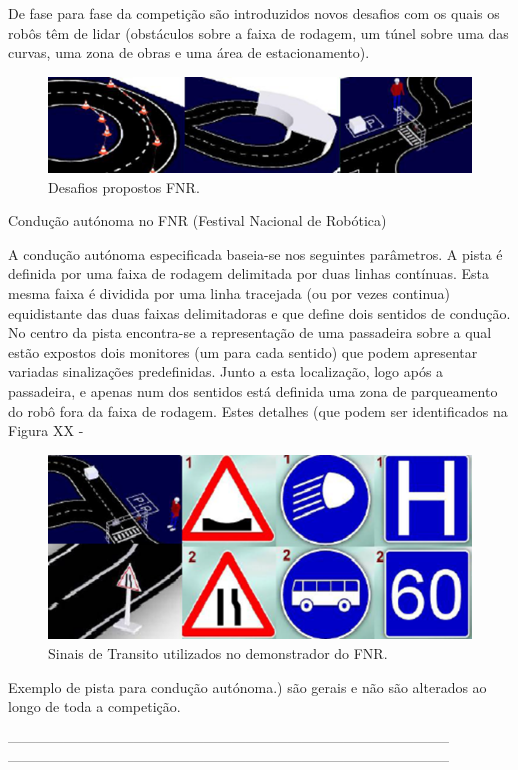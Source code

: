 \documentclass[a4paper,10pt]{texRel}
\begin{document}
De fase para fase da competição são introduzidos novos desafios com os quais os robôs têm de lidar (obstáculos sobre a faixa de rodagem, um túnel sobre uma das curvas, uma zona de obras e uma área de estacionamento).

\begin{figure}[H]
\centering
\includegraphics{Desafios_FNR.png}
\caption{Desafios propostos FNR.}
\label{fig3_FNR}
\end{figure}

Condução autónoma no FNR (Festival Nacional de Robótica)

A condução autónoma especificada baseia-se nos seguintes parâmetros. A pista é definida por uma faixa de rodagem delimitada por duas linhas contínuas. Esta mesma faixa é dividida por uma linha tracejada (ou por vezes continua) equidistante das duas faixas delimitadoras e que define dois sentidos de condução. No centro da pista encontra-se a representação de uma passadeira sobre a qual estão expostos dois monitores (um para cada sentido) que podem apresentar variadas sinalizações predefinidas. Junto a esta localização, logo após a passadeira, e apenas num dos sentidos está definida uma zona de parqueamento do robô fora da faixa de rodagem. Estes detalhes (que podem ser identificados na Figura XX - 

\begin{figure}[H]
\centering
\includegraphics{sinais_transito_FNR.png}
\caption{Sinais de Transito utilizados no demonstrador do FNR.}
\label{fig4_FNR}
\end{figure}

Exemplo de pista para condução autónoma.) são gerais e não são alterados ao longo de toda a competição.  



-----------------------------------------------------------------------------------------------\\
-----------------------------------------------------------------------------------------------\\

%

\end{document}
